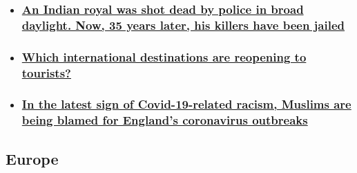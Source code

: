\begin{itemize}
\item
  \hypertarget{an-indian-royal-was-shot-dead-by-police-in-broad-daylight-now-35-years-later-his-killers-have-been-jailed}{%
  \subsubsection{\texorpdfstring{\href{/2020/08/07/asia/india-maharaja-police-sentence-intl-dst-hnk/index.html}{An
  Indian royal was shot dead by police in broad daylight. Now, 35 years
  later, his killers have been
  jailed}}{An Indian royal was shot dead by police in broad daylight. Now, 35 years later, his killers have been jailed}}\label{an-indian-royal-was-shot-dead-by-police-in-broad-daylight-now-35-years-later-his-killers-have-been-jailed}}
\item
  \hypertarget{which-international-destinations-are-reopening-to-tourists}{%
  \subsubsection{\texorpdfstring{\href{/travel/article/global-destinations-reopening-to-tourists/index.html}{Which
  international destinations are reopening to
  tourists?}}{Which international destinations are reopening to tourists?}}\label{which-international-destinations-are-reopening-to-tourists}}
\item
  \hypertarget{in-the-latest-sign-of-covid-19-related-racism-muslims-are-being-blamed-for-englands-coronavirus-outbreaks}{%
  \subsubsection{\texorpdfstring{\href{/2020/08/06/europe/muslims-coronavirus-england-islamophobia-gbr-intl/index.html}{In
  the latest sign of Covid-19-related racism, Muslims are being blamed
  for England's coronavirus
  outbreaks}}{In the latest sign of Covid-19-related racism, Muslims are being blamed for England's coronavirus outbreaks}}\label{in-the-latest-sign-of-covid-19-related-racism-muslims-are-being-blamed-for-englands-coronavirus-outbreaks}}
\end{itemize}

\hypertarget{europe-1}{%
\subsection{Europe}\label{europe-1}}

\href{/2020/08/07/europe/italy-school-return-sawing-up-desks-coronavirus-intl/index.html}{}

